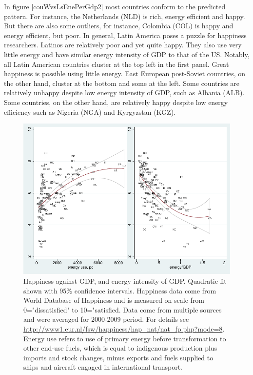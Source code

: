 \documentclass[10pt, letterpaper]{article}
\begin{document}
\begin{spacing}{1.4}
In figure \ref{couWvsLsEnePerGdp2} most countries conform to the predicted pattern. 
 For instance,  the Netherlands (NLD) is rich,  energy efficient and happy. But
 there are also some outliers, for instance,  Colombia (COL) is  happy and energy
 efficient,  but poor.  
In general, Latin America poses a puzzle for happiness researchers. Latinos are
relatively poor and yet quite happy. They also use very little  energy and have similar energy intensity of GDP to that of the  US. Notably, all Latin
 American countries cluster at the top left in the
first panel.  Great happiness is possible using little  energy. East European
post-Soviet countries, on the other hand, cluster at the bottom and some at the
left. Some countries are relatively unhappy despite low energy intensity of GDP,
such as Albania (ALB). Some countries, on the other hand, are relatively happy
despite low energy efficiency such as Nigeria (NGA) and Kyrgyzstan (KGZ).    
\begin{figure}[H]
 \includegraphics[width=6in]{graphsAndTables/couWdhEneGdp.pdf}\centering \caption{Happiness against GDP,  and energy intensity of GDP. Quadratic fit shown with 95\% confidence intervals. Happiness data come from World Database of Happiness and is measured on scale from 0="dissatisfied" to 10="satisfied. Data come from multiple sources and were averaged for 2000-2009 period. For details see \url{http://www1.eur.nl/fsw/happiness/hap_nat/nat_fp.php?mode=8}.  Energy use refers to use of primary energy before transformation to other end-use fuels, which is equal to indigenous production plus imports and stock changes, minus exports and fuels supplied to ships and aircraft engaged in international transport. %
}
\end{figure}
\end{spacing}
\end{document}
